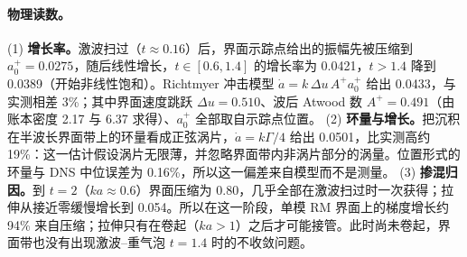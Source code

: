 \paragraph{物理读数。}
(1) \textbf{增长率。}激波扫过（$t\approx0.16$）后，界面示踪点给出的振幅先被压缩到 $a_0^+=0.0275$，随后线性增长，$t\in[0.6,1.4]$ 的增长率为 0.0421，$t>1.4$ 降到 0.0389（开始非线性饱和）。Richtmyer 冲击模型 $\dot a=k\,\Delta u\,A^+a_0^+$ 给出 0.0433，与实测相差 3\%；其中界面速度跳跃 $\Delta u=0.510$、波后 Atwood 数 $A^+=0.491$（由账本密度 2.17 与 6.37 求得）、$a_0^+$ 全部取自示踪点位置。
(2) \textbf{环量与增长。}把沉积在半波长界面带上的环量看成正弦涡片，$\dot a=k\Gamma/4$ 给出 0.0501，比实测高约 19\%：这一估计假设涡片无限薄，并忽略界面带内非涡片部分的涡量。位置形式的环量与 DNS 中位误差为 0.16\%，所以这一偏差来自模型而不是测量。
(3) \textbf{掺混归因。}到 $t=2$（$ka\approx0.6$）界面压缩为 0.80，几乎全部在激波扫过时一次获得；拉伸从接近零缓慢增长到 0.054。所以在这一阶段，单模 RM 界面上的梯度增长约 94\% 来自压缩；拉伸只有在卷起（$ka>1$）之后才可能接管。此时尚未卷起，界面带也没有出现激波–重气泡 $t=1.4$ 时的不收敛问题。
